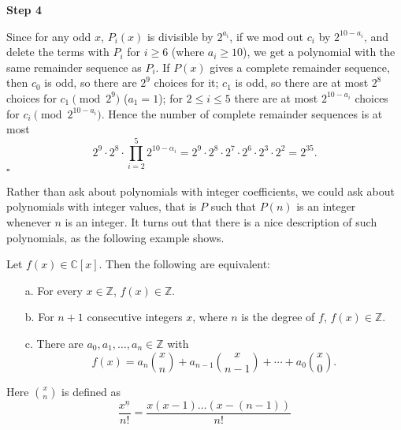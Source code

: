 \noindent \textbf{Step 4} 

Since for any odd $x$, $P_i(x)$ is divisible by $2^{a_i}$, if we mod out $c_i$ by $2^{10-a_i}$, and delete the terms with $P_i$ for $i\geq 6$ (where $a_i\geq 10$), we get a polynomial with the same remainder sequence as $P_i$. If $P(x)$ gives a complete remainder sequence, then $c_0$ is odd, so there are $2^9$ choices for it; $c_1$ is odd, so there are at most $2^8$ choices for $c_1\pmod{2^9}$ ($a_1=1$); for $2\leq i\leq 5$ there are at most $2^{10-a_i}$ choices for $c_{i}\pmod{2^{10-a_i}}$. Hence the number of complete remainder sequences is at most
\[2^9\cdot 2^8\cdot\prod_{i=2}^5 2^{10-\alpha_i}=2^9\cdot 2^8\cdot 2^7\cdot2^6\cdot2^3\cdot2^2=2^{35}.\]
$\square$

Rather than ask about polynomials with integer coefficients, we could ask about polynomials with integer values, that is $P$ such that $P(n)$ is an integer whenever $n$ is an integer. It turns out that there is a nice description of such polynomials, as the following example shows.
\begin{thm}
Let $f(x)\in \mathbb C[x]$. Then the following are
equivalent:
\begin{enumerate}
\item[a.] For every $x\in \mathbb Z$, $f(x)\in\mathbb Z$.
\item[b.] For $n+1$ consecutive integers $x$, where $n$ is the degree of $f$, $f(x)\in\mathbb Z$.
\item[c.] There are $a_0,a_1,\ldots,a_n\in\mathbb Z$ with \[f(x) =
a_n\binom xn + a_{n-1}\binom x{n-1} + \cdots+a_0\binom x0.\]
\end{enumerate}
\end{thm}
Here $\binom{x}{n}$ is defined as 
\[\frac{x^{\underline{n}}}{n!}=\frac{x(x-1)\ldots (x-(n-1))}{n!}\]

